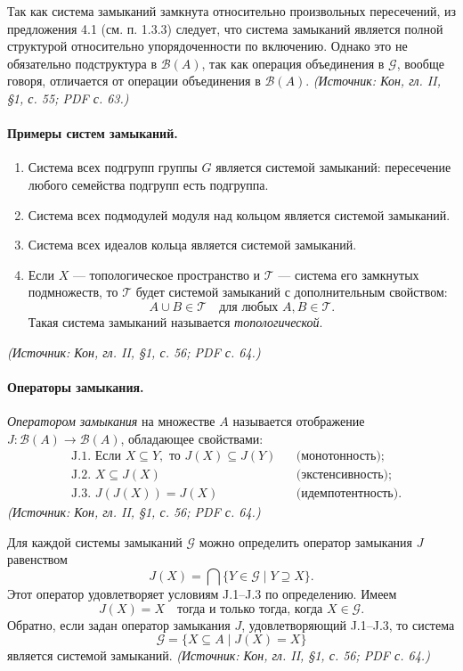 \documentclass[a4paper,12pt]{article}
\begin{document}
Так как система замыканий замкнута относительно произвольных пересечений, из предложения 4.1 (см. п. 1.3.3) следует, что система замыканий является полной структурой относительно упорядоченности по включению. Однако это не обязательно подструктура в \(\mathcal{B}(A)\), так как операция объединения в \(\mathcal{G}\), вообще говоря, отличается от операции объединения в \(\mathcal{B}(A)\).
\textit{(Источник: Кон, гл. II, §1, с. 55; PDF с. 63.)}

\paragraph{Примеры систем замыканий.}
\begin{enumerate}[label=(\arabic*)]
\item Система всех подгрупп группы \(G\) является системой замыканий: пересечение любого семейства подгрупп есть подгруппа.
\item Система всех подмодулей модуля над кольцом является системой замыканий.
\item Система всех идеалов кольца является системой замыканий.
\item Если \(X\) — топологическое пространство и \(\mathcal{T}\) — система его замкнутых подмножеств, то \(\mathcal{T}\) будет системой замыканий с дополнительным свойством:
\[
A\cup B\in\mathcal{T}\quad\text{для любых }A,B\in\mathcal{T}.
\]
Такая система замыканий называется \emph{топологической}.
\end{enumerate}
\textit{(Источник: Кон, гл. II, §1, с. 56; PDF с. 64.)}

\paragraph{Операторы замыкания.}
\emph{Оператором замыкания} на множестве \(A\) называется отображение \(J\colon\mathcal{B}(A)\to\mathcal{B}(A)\), обладающее свойствами:
\[
\begin{aligned}
&\text{J.1. Если }X\subseteq Y,\text{ то }J(X)\subseteq J(Y) &&\text{(монотонность)};\\
&\text{J.2. }X\subseteq J(X) &&\text{(экстенсивность)};\\
&\text{J.3. }J(J(X))=J(X) &&\text{(идемпотентность)}.
\end{aligned}
\]
\textit{(Источник: Кон, гл. II, §1, с. 56; PDF с. 64.)}

Для каждой системы замыканий \(\mathcal{G}\) можно определить оператор замыкания \(J\) равенством
\[
J(X)=\bigcap\{Y\in\mathcal{G}\mid Y\supseteq X\}.
\]
Этот оператор удовлетворяет условиям J.1--J.3 по определению. Имеем
\[
J(X)=X\quad\text{тогда и только тогда, когда }X\in\mathcal{G}.
\]
Обратно, если задан оператор замыкания \(J\), удовлетворяющий J.1--J.3, то система
\[
\mathcal{G}=\{X\subseteq A\mid J(X)=X\}
\]
является системой замыканий.
\textit{(Источник: Кон, гл. II, §1, с. 56; PDF с. 64.)}
\end{document}
